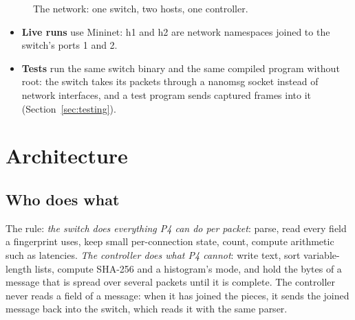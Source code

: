 \documentclass[11pt,a4paper]{article}
\newcommand{\code}[1]{\texttt{#1}}
\begin{document}
\begin{figure}[H]\centering
{}
\caption{The network: one switch, two hosts, one controller.}
\end{figure}

\begin{itemize}
\item \textbf{Live runs} use Mininet: h1 and h2 are network namespaces joined to the switch's ports 1 and 2.
\item \textbf{Tests} run the same switch binary and the same compiled program without root: the switch takes its
  packets through a nanomsg socket instead of network interfaces, and a test program sends captured frames into
  it (Section~\ref{sec:testing}).
\end{itemize}

\section{Architecture}

\subsection{Who does what}

The rule: \emph{the switch does everything P4 can do per packet}: parse, read every field a fingerprint uses, keep
small per-connection state, count, compute arithmetic such as latencies. \emph{The controller does what P4 cannot}:
write text, sort variable-length lists, compute SHA-256 and a histogram's mode, and hold the bytes of a message
that is spread over several packets until it is complete. The controller never reads a field of a message: when it
has joined the pieces, it sends the joined message back into the switch, which reads it with the same parser.
\end{document}
